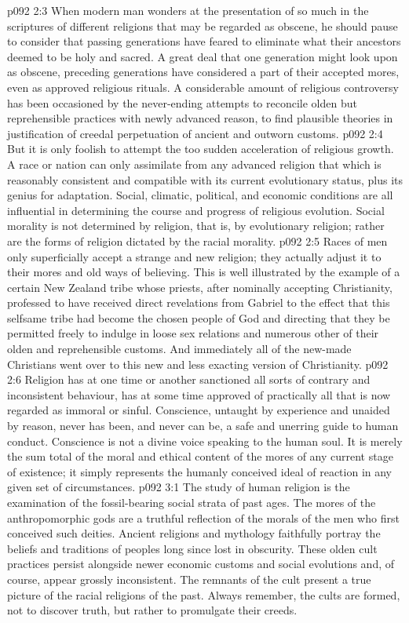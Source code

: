 \vs p092 2:3 When modern man wonders at the presentation of so much in the scriptures of different religions that may be regarded as obscene, he should pause to consider that passing generations have feared to eliminate what their ancestors deemed to be holy and sacred. A great deal that one generation might look upon as obscene, preceding generations have considered a part of their accepted mores, even as approved religious rituals. A considerable amount of religious controversy has been occasioned by the never\hyp{}ending attempts to reconcile olden but reprehensible practices with newly advanced reason, to find plausible theories in justification of creedal perpetuation of ancient and outworn customs.
\vs p092 2:4 But it is only foolish to attempt the too sudden acceleration of religious growth. A race or nation can only assimilate from any advanced religion that which is reasonably consistent and compatible with its current evolutionary status, plus its genius for adaptation. Social, climatic, political, and economic conditions are all influential in determining the course and progress of religious evolution. Social morality is not determined by religion, that is, by evolutionary religion; rather are the forms of religion dictated by the racial morality.
\vs p092 2:5 Races of men only superficially accept a strange and new religion; they actually adjust it to their mores and old ways of believing. This is well illustrated by the example of a certain New Zealand tribe whose priests, after nominally accepting Christianity, professed to have received direct revelations from Gabriel to the effect that this selfsame tribe had become the chosen people of God and directing that they be permitted freely to indulge in loose sex relations and numerous other of their olden and reprehensible customs. And immediately all of the new\hyp{}made Christians went over to this new and less exacting version of Christianity.
\vs p092 2:6 Religion has at one time or another sanctioned all sorts of contrary and inconsistent behaviour, has at some time approved of practically all that is now regarded as immoral or sinful. Conscience, untaught by experience and unaided by reason, never has been, and never can be, a safe and unerring guide to human conduct. Conscience is not a divine voice speaking to the human soul. It is merely the sum total of the moral and ethical content of the mores of any current stage of existence; it simply represents the humanly conceived ideal of reaction in any given set of circumstances.
\vs p092 3:1 The study of human religion is the examination of the fossil\hyp{}bearing social strata of past ages. The mores of the anthropomorphic gods are a truthful reflection of the morals of the men who first conceived such deities. Ancient religions and mythology faithfully portray the beliefs and traditions of peoples long since lost in obscurity. These olden cult practices persist alongside newer economic customs and social evolutions and, of course, appear grossly inconsistent. The remnants of the cult present a true picture of the racial religions of the past. Always remember, the cults are formed, not to discover truth, but rather to promulgate their creeds.
